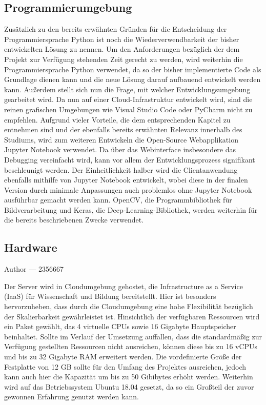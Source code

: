 \documentclass[12pt, a4paper]{report}
\makeatletter
\newcommand{\sectionauthor}[1]{%
  {\parindent0pt\vspace*{-5pt}%
  \large{Author --- }
  \linespread{1.1}\large\scshape#1%
  \par\nobreak\vspace*{35pt} }
  \@afterheading%
}
\makeatother
\begin{document}
\subsection{Programmierumgebung}
Zusätzlich zu den bereits erwähnten Gründen für die Entscheidung der Programmiersprache Python ist noch die Wiederverwendbarkeit der bisher entwickelten Lösung zu nennen. Um den Anforderungen bezüglich der dem Projekt zur Verfügung stehenden Zeit gerecht zu werden, wird weiterhin die Programmiersprache Python verwendet, da so der bisher implementierte Code als Grundlage dienen kann und die neue Lösung darauf aufbauend entwickelt werden kann. Außerdem stellt sich nun die Frage, mit welcher Entwicklungsumgebung gearbeitet wird. Da nun auf einer Cloud-Infrastruktur entwickelt wird, sind die reinen grafischen Umgebungen wie Visual Studio Code oder PyCharm nicht zu empfehlen. Aufgrund vieler Vorteile, die dem entsprechenden Kapitel zu entnehmen sind und der ebenfalls bereits erwähnten Relevanz innerhalb des Studiums, wird zum weiteren Entwickeln die Open-Source Webapplikation Jupyter Notebook verwendet. Da über das Webinterface insbesondere das Debugging vereinfacht wird, kann vor allem der Entwicklungsprozess signifikant beschleunigt werden. Der Einheitlichkeit halber wird die Clientanwendung ebenfalls mithilfe von Jupyter Notebook entwickelt, wobei diese in der finalen Version durch minimale Anpassungen auch problemlos ohne Jupyter Notebook ausführbar gemacht werden kann. OpenCV, die Programmbibliothek für Bildverarbeitung und Keras, die Deep-Learning-Bibliothek, werden weiterhin für die bereits beschriebenen Zwecke verwendet.

\subsection{Hardware}
\sectionauthor{2356667}
Der Server wird in Cloudumgebung gehostet, die Infrastructure as a Service (IaaS) für Wissenschaft und Bildung bereitstellt. Hier ist besonders hervorzuheben, dass durch die Cloudumgebung eine hohe Flexibilität bezüglich der Skalierbarkeit gewährleistet ist. Hinsichtlich der verfügbaren Ressourcen wird ein Paket gewählt, das 4 virtuelle CPUs sowie 16 Gigabyte Hauptspeicher beinhaltet. Sollte im Verlauf der Umsetzung auffallen, dass die standardmäßig zur Verfügung gestellten Ressourcen nicht ausreichen, können diese bis zu 16 vCPUs und bis zu 32 Gigabyte RAM erweitert werden. Die vordefinierte Größe der Festplatte von 12 GB sollte für den Umfang des Projektes ausreichen, jedoch kann auch hier die Kapazität um bis zu 50 Gibibytes erhöht werden. Weiterhin wird auf das Betriebssystem Ubuntu 18.04 gesetzt, da so ein Großteil der zuvor gewonnen Erfahrung genutzt werden kann.
\end{document}
